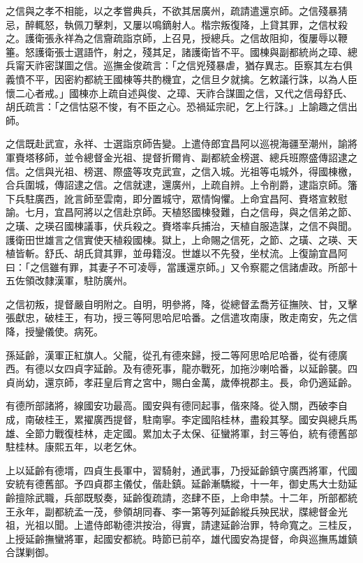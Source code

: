 \begin{pinyinscope}
之信與之孝不相能，以之孝嘗典兵，不欲其居廣州，疏請遣還京師。之信殘暴猜忌，醉輒怒，執佩刀擊刺，又屢以鳴鏑射人。楷宗叛復降，上貸其罪，之信杖殺之。護衛張永祥為之信齎疏詣京師，上召見，授總兵。之信故阻抑，復屢辱以鞭箠。怒護衛張士選語忤，射之，殘其足，諸護衛皆不平。國棟與副都統尚之璋、總兵甯天祚密謀圖之信。巡撫金俊疏言：「之信兇殘暴虐，猶存異志。臣察其左右俱義憤不平，因密約都統王國棟等共酌機宜，之信旦夕就擒。乞敕議行誅，以為人臣懷二心者戒。」國棟亦上疏自述與俊、之璋、天祚合謀圖之信，又代之信母舒氏、胡氏疏言：「之信怙惡不悛，有不臣之心。恐禍延宗祀，乞上行誅。」上諭趣之信出師。

之信既赴武宣，永祥、士選詣京師告變。上遣侍郎宜昌阿以巡視海疆至潮州，諭將軍賚塔移師，並令總督金光祖、提督折爾肯、副都統金榜選、總兵班際盛傳詔逮之信。之信與光祖、榜選、際盛等攻克武宣，之信入城。光祖等屯城外，得國棟檄，合兵圍城，傳詔逮之信。之信就逮，還廣州，上疏自辨。上令削爵，逮詣京師。籓下兵駐廣西，訛言師至雲南，即分置城守，眾情恟懼。上命宜昌阿、賚塔宣敕慰諭。七月，宜昌阿將以之信赴京師。天植怒國棟發難，白之信母，與之信弟之節、之璜、之瑛召國棟議事，伏兵殺之。賚塔率兵捕治，天植自服造謀，之信不與聞。護衛田世雄言之信實使天植殺國棟。獄上，上命賜之信死，之節、之璜、之瑛、天植皆斬。舒氏、胡氏貸其罪，並毋籍沒。世雄以不先發，坐杖流。上復諭宜昌阿曰：「之信雖有罪，其妻子不可凌辱，當護還京師。」又令察罷之信諸虐政。所部十五佐領改隸漢軍，駐防廣州。

之信初叛，提督嚴自明附之。自明，明參將，降，從總督孟喬芳征撫陜、甘，又擊張獻忠，破桂王，有功，授三等阿思哈尼哈番。之信遣攻南康，敗走南安，先之信降，授鑾儀使。病死。

孫延齡，漢軍正紅旗人。父龍，從孔有德來歸，授二等阿思哈尼哈番，從有德廣西。有德以女四貞字延齡。及有德死事，龍亦戰死，加拖沙喇哈番，以延齡襲。四貞尚幼，還京師，孝莊皇后育之宮中，賜白金萬，歲俸視郡主。長，命仍適延齡。

有德所部諸將，線國安功最高。國安與有德同起事，偕來降。從入關，西破李自成，南破桂王，累擢廣西提督，駐南寧。李定國陷桂林，盡殺其孥。國安與總兵馬雄、全節力戰復桂林，走定國。累加太子太保、征蠻將軍，封三等伯，統有德舊部駐桂林。康熙五年，以老乞休。

上以延齡有德壻，四貞生長軍中，習騎射，通武事，乃授延齡鎮守廣西將軍，代國安統有德舊部。予四貞郡主儀仗，偕赴鎮。延齡漸驕縱，十一年，御史馬大士劾延齡擅除武職，兵部既駁奏，延齡復疏請，恣肆不臣，上命申禁。十二年，所部都統王永年，副都統孟一茂，參領胡同春、李一第等列延齡縱兵殃民狀，牒總督金光祖，光祖以聞。上遣侍郎勒德洪按治，得實，請逮延齡治罪，特命寬之。三桂反，上授延齡撫蠻將軍，起國安都統。時節已前卒，雄代國安為提督，命與巡撫馬雄鎮合謀剿御。


\end{pinyinscope}
